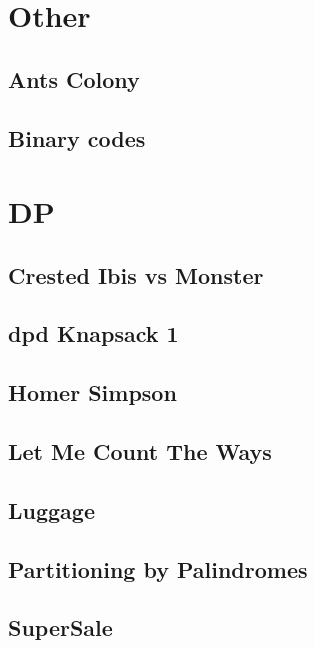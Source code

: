 \section{Other}
        \subsection{Ants Colony}
                
        \subsection{Binary codes}        
                

\section{DP}
        \subsection{Crested Ibis vs Monster}
                
        \subsection{dpd Knapsack 1}
                
        \subsection{Homer Simpson}
                
        \subsection{Let Me Count The Ways}
                
        \subsection{Luggage}
                
        \subsection{Partitioning by Palindromes}
                
        \subsection{SuperSale}
                
